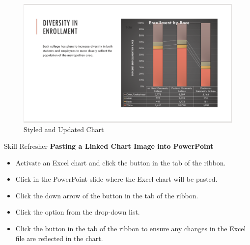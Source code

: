 \begin{figure}[H]
	\centering
	\includegraphics[width=\maxwidth{.95\linewidth}]{gfx/ch04_fig48}
	\caption{Styled and Updated Chart}
	\label{04:fig48}
\end{figure}

\begin{center}
	\begin{sklbox}{Skill Refresher}
		\textbf{Pasting a Linked Chart Image into PowerPoint}
		\\
		\begin{itemize}
			\setlength{\itemsep}{0pt}
			\setlength{\parskip}{0pt}
			\setlength{\parsep}{0pt}
			
			\item Activate an Excel chart and click the  button in the  tab of the ribbon.
			\item Click in the PowerPoint slide where the Excel chart will be pasted.
			\item Click the down arrow of the  button in the  tab of the ribbon.
			\item Click the  option from the drop-down list.
			\item Click the  button in the  tab of the ribbon to ensure any changes in the Excel file are reflected in the chart.
			
		\end{itemize}
	\end{sklbox}
\end{center}

